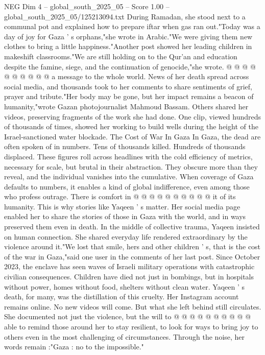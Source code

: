 \begin{textsample}{NEG Dim 4 – global\_south\_2025\_05 – Score 1.00 – global\_south\_2025\_05/125213094.txt}
During Ramadan, she stood next to a communal pot and explained how to prepare iftar when gas ran out."Today was a day of joy for Gaza ' s orphans,"she wrote in Arabic."We were giving them new clothes to bring a little happiness."Another post showed her leading children in makeshift classrooms."We are still holding on to the Qur'an and education despite the famine, siege, and the continuation of genocide,"she wrote. @ @ @ @ @ @ @ @ @ @ a message to the whole world.
News of her death spread across social media, and thousands took to her comments to share sentiments of grief, prayer and tribute."Her body may be gone, but her impact remains a beacon of humanity,"wrote Gazan photojournalist Mahmoud Bassam.
Others shared her videos, preserving fragments of the work she had done.
One clip, viewed hundreds of thousands of times, showed her working to build wells during the height of the Israel-sanctioned water blockade.
The Cost of War In Gaza In Gaza, the dead are often spoken of in numbers.
Tens of thousands killed.
Hundreds of thousands displaced.
These figures roll across headlines with the cold efficiency of metrics, necessary for scale, but brutal in their abstraction.
They obscure more than they reveal, and the individual vanishes into the cumulative.
When coverage of Gaza defaults to numbers, it enables a kind of global indifference, even among those who profess outrage.
There is comfort in @ @ @ @ @ @ @ @ @ @ it of its humanity.
This is why stories like Yaqeen ' s matter.
Her social media page enabled her to share the stories of those in Gaza with the world, and in ways preserved them even in death.
In the middle of collective trauma, Yaqeen insisted on human connection.
She shared everyday life rendered extraordinary by the violence around it."We lost that smile, hers and other children ' s, that is the cost of the war in Gaza,"said one user in the comments of her last post.
Since October 2023, the enclave has seen waves of Israeli military operations with catastrophic civilian consequences.
Children have died not just in bombings, but in hospitals without power, homes without food, shelters without clean water.
Yaqeen ' s death, for many, was the distillation of this cruelty.
Her Instagram account remains online.
No new videos will come.
But what she left behind still circulates.
She documented not just the violence, but the will to @ @ @ @ @ @ @ @ @ @ able to remind those around her to stay resilient, to look for ways to bring joy to others even in the most challenging of circumstances.
Through the noise, her words remain :"Gaza : no to the impossible."

\end{textsample}
